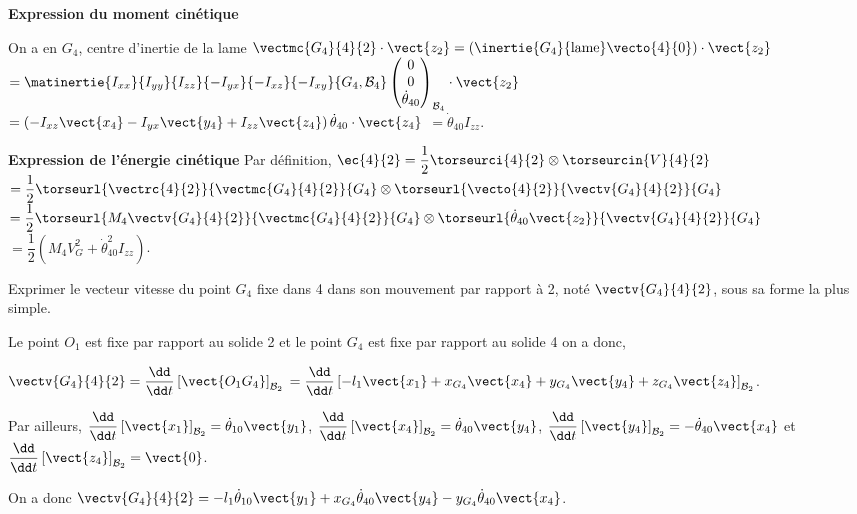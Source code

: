 \documentclass[11pt]{article}
\begin{document}
\begin{UPSTIcorrige}
\textbf{Expression du moment cinétique}

On a en $G_4$, centre d'inertie de la lame $\vectmc{G_4}{4}{2}\cdot \vect{z_2} = \left(\inertie{G_4}{\text{lame}}\vecto{4}{0}\right) \cdot\vect{z_2}$ 
$ = \matinertie{I_{xx}}{I_{yy}}{I_{zz}}{-I_{yx}}{-I_{xz}}{-I_{xy}}{G_4,\mathcal{B}_4} 
\begin{pmatrix} 0 \\ 0 \\ \dot{\theta}_{40} \end{pmatrix}_{\mathcal{B}_4} \cdot\vect{z_2}
$
$= \left(-I_{xz} \vect{x_4}-I_{yx} \vect{y_4}+I_{zz} \vect{z_4}\right)\dot{\theta}_{40} \cdot \vect{z_4}$
$= \dot{\theta}_{40}  I_{zz}$.

\textbf{Expression de l'énergie cinétique}
Par définition, $\ec{4}{2} = \dfrac{1}{2}\torseurci{4}{2} \otimes \torseurcin{V}{4}{2}$
$ = \dfrac{1}{2}\torseurl{\vectrc{4}{2}}{\vectmc{G_4}{4}{2}}{G_4} \otimes \torseurl{\vecto{4}{2}}{\vectv{G_4}{4}{2}}{G_4} $
$ = \dfrac{1}{2}\torseurl{M_4 \vectv{G_4}{4}{2}}{\vectmc{G_4}{4}{2}}{G_4} \otimes \torseurl{\dot{\theta}_{40}\vect{z_2}}{\vectv{G_4}{4}{2}}{G_4} $
$ = \dfrac{1}{2} \left(M_4 V_G^2 +\dot{\theta}_{40}^2  I_{zz} \right)$.

\end{UPSTIcorrige}



\UPSTIquestion  Exprimer le vecteur vitesse du point $G_4$ fixe dans 4 dans son mouvement par rapport à 2, noté $\vectv{G_4}{4}{2}$, sous sa forme la plus simple.

\begin{UPSTIcorrige}
Le point $O_1$ est fixe par rapport au solide 2 et le point $G_4$ est fixe par rapport au solide 4 on a donc,

$\vectv{G_4}{4}{2} = \dfrac{\dd }{\dd t} \left[\vect{O_1 G_4}\right]_{\mathcal{B}_2} $
$ = \dfrac{\dd  }{\dd t} \left[ -l_1 \vect{x_1} +  x_{G_4} \vect{x_4}+ y_{G_4} \vect{y_4}+ z_{G_4} \vect{z_4}\right]_{\mathcal{B}_2} $.

Par ailleurs, $\dfrac{\dd }{\dd t}\left[\vect{x_1}\right]_{\mathcal{B}_2}=\dot{\theta}_{10} \vect{y_1}$, 
$\dfrac{\dd }{\dd t}\left[\vect{x_4}\right]_{\mathcal{B}_2}=\dot{\theta}_{40} \vect{y_4}$, 
$\dfrac{\dd }{\dd t}\left[\vect{y_4}\right]_{\mathcal{B}_2}=-\dot{\theta}_{40}\vect{x_4}$ et
$\dfrac{\dd }{\dd t}\left[\vect{z_4}\right]_{\mathcal{B}_2}= \vect{0}$.

On a donc $\vectv{G_4}{4}{2} =-l_1\dot{\theta}_{10} \vect{y_1} +  x_{G_4} \dot{\theta}_{40} \vect{y_4}- y_{G_4} \dot{\theta}_{40} \vect{x_4}$.

\end{UPSTIcorrige}
\end{document}
